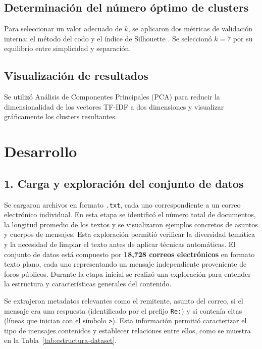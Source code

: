 \documentclass[journal]{IEEEtran}
\begin{document}
\subsection{Determinación del número óptimo de clusters}
Para seleccionar un valor adecuado de $k$, se aplicaron dos métricas de validación interna: el método del codo y el índice de Silhouette \cite{rousseeuw1987silhouettes}. Se seleccionó $k=7$ por su equilibrio entre simplicidad y separación.

\subsection{Visualización de resultados}
Se utilizó Análisis de Componentes Principales (PCA) para reducir la dimensionalidad de los vectores TF-IDF a dos dimensiones y visualizar gráficamente los clusters resultantes.

\section{Desarrollo}

\subsection*{1. Carga y exploración del conjunto de datos}

Se cargaron archivos en formato \texttt{.txt}, cada uno correspondiente a un correo electrónico individual. En esta etapa se identificó el número total de documentos, la longitud promedio de los textos y se visualizaron ejemplos concretos de asuntos y cuerpos de mensajes. Esta exploración permitió verificar la diversidad temática y la necesidad de limpiar el texto antes de aplicar técnicas automáticas.
\vspace{12pt}
El conjunto de datos está compuesto por \textbf{18,728 correos electrónicos} en formato texto plano, cada uno representando un mensaje independiente proveniente de foros públicos. Durante la etapa inicial se realizó una exploración para entender la estructura y características generales del contenido.

\vspace{12pt}
Se extrajeron metadatos relevantes como el remitente, asunto del correo, si el mensaje era una respuesta (identificado por el prefijo \texttt{Re:}) y si contenía citas (líneas que inician con el símbolo \texttt{>}). Esta información permitió caracterizar el tipo de mensajes contenidos y establecer relaciones entre ellos, como se muestra en la Tabla~\ref{tab:estructura-dataset}.
\end{document}
